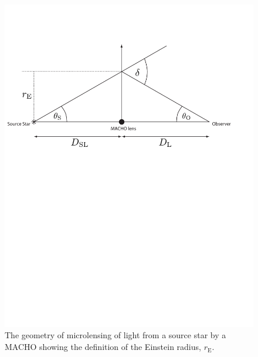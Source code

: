 \begin{figure}[p]
\label{f:macholens}
\begin{center}
\includegraphics[width=\linewidth]{figures/macho/lensing}
\end{center}
\caption[Gravitational Lensing of Light By a MACHO]{%
The geometry of microlensing of light from a source star by a MACHO showing
the definition of the Einstein radius, $r_\mathrm{E}$.
}
\end{figure}

